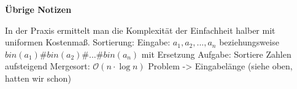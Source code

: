 \documentclass{article} %
\begin{document}



\begin{framed}
\textbf{Übrige Notizen}

In der Praxis ermittelt man die Komplexität der Einfachheit halber mit uniformen Kostenmaß.
Sortierung:
Eingabe: $a_1, a_2,...,a_n$ beziehungsweise $bin(a_1) \# bin(a_2) \# ... \# bin(a_n) $ mit Ersetzung 
Aufgabe: Sortiere Zahlen aufsteigend
Mergesort: $\mathcal{O}(n \cdot \log n)$
Problem -> Eingabelänge (siehe oben, hatten wir schon)
\end{framed}
\end{document}

